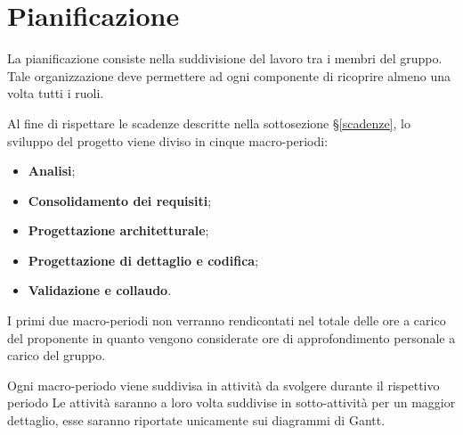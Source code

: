 \documentclass[../piano-di-progetto.tex]{subfiles}
\begin{document}
\section{Pianificazione}
La pianificazione consiste nella suddivisione del lavoro tra i membri del gruppo. Tale organizzazione deve permettere ad ogni componente di ricoprire almeno una volta tutti i ruoli.

Al fine di rispettare le scadenze descritte nella sottosezione \S\ref{scadenze}, lo sviluppo del progetto viene diviso in cinque macro-periodi:
\begin{itemize}
    \item \textbf{Analisi};
    \item \textbf{Consolidamento dei requisiti};
    \item \textbf{Progettazione architetturale};
    \item \textbf{Progettazione di dettaglio e codifica};
    \item \textbf{Validazione e collaudo}.
\end{itemize}
I primi due macro-periodi non verranno rendicontati nel totale delle ore a carico del proponente in quanto vengono considerate ore di approfondimento personale a carico del gruppo.

Ogni macro-periodo viene suddivisa in attività da svolgere durante il rispettivo periodo Le attività saranno a loro volta suddivise in sotto-attività per un maggior dettaglio, esse saranno riportate unicamente sui diagrammi di Gantt.
\end{document}
